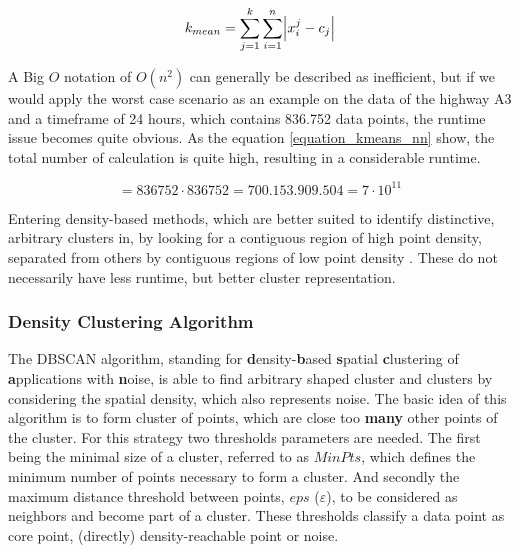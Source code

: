 \begin{equation}
\label{formula_kmeans}
	k_{mean} =  \sum_{j=1}^k{\sum_{i=1}^n{\abs{x_i^j-c_j}}}
\end{equation}

\bigskip

A Big $O$ notation of $O(n^2)$ can generally be described as inefficient, but if we would apply the worst case scenario as an example on the data of the highway A3 and a timeframe of 24 hours, which contains 836.752 data points, the runtime issue becomes quite obvious. As the equation \ref{equation_kmeans_nn} show, the total number of calculation is quite high, resulting in a considerable runtime. \parencite{Busch2004}

\begin{equation}
\label{equation_kmeans_nn}
	 = 836752 \cdot 836752 = 700.153.909.504 = 7 \cdot 10^{11}
\end{equation}

\bigskip

Entering density-based methods, which are better suited to identify distinctive, arbitrary clusters in, by looking for a contiguous region of high point density, separated from others by contiguous regions of low point density \parencite{Chauhan2020}. These do not necessarily have less runtime, but better cluster representation.

\subsubsection{Density Clustering Algorithm}
The DBSCAN algorithm, standing for \textbf{d}ensity-\textbf{b}ased \textbf{s}patial \textbf{c}lustering of \textbf{a}pplications with \textbf{n}oise, is able to find arbitrary shaped cluster and clusters by considering the spatial density, which also represents noise. The basic idea of this algorithm is to form cluster of points, which are close too \textbf{many} other points of the cluster. For this strategy two thresholds parameters are needed. The first being the minimal size of a cluster, referred to as $MinPts$, which defines the minimum number of points necessary to form a cluster. And secondly the maximum distance threshold between points, $eps$ ($\varepsilon$), to be considered as neighbors and become part of a cluster. These thresholds classify a data point as core point, (directly) density-reachable point or noise. \parencite{Yildirim2020,Chauhan2020,Padro2017}

